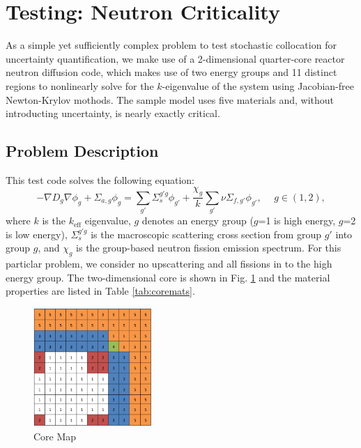 \section{Testing: Neutron Criticality} \label{section diffusion}
As a simple yet sufficiently complex problem to test stochastic collocation for uncertainty quantification, we make use of a 2-dimensional quarter-core reactor neutron diffusion code, which makes use of two energy groups and 11 distinct regions to nonlinearly solve for the $k$-eigenvalue of the system using Jacobian-free Newton-Krylov mothods.  The sample model uses five materials and, without introducting uncertainty, is nearly exactly critical.

\subsection{Problem Description}
This test code solves the following equation:
\begin{equation}
-\nabla D_g\nabla\phi_g+\Sigma_{a,g}\phi_g=\sum_{g'}\Sigma_s^{g'g}\phi_{g'}+\frac{\chi_g}{k}\sum_{g'}\nu\Sigma_{f,g'}\phi_{g'}, \hspace{15pt}g\in(1,2),
\end{equation}
where $k$ is the $k_\text{eff}$ eigenvalue, $g$ denotes an energy group ($g$=1 is high energy, $g$=2 is low energy), $\Sigma_s^{g'g}$ is the macroscopic scattering cross section from group $g'$ into group $g$, and $\chi_g$ is the group-based neutron fission emission spectrum.  For this particlar problem, we consider no upscattering and all fissions in to the high energy group.
The two-dimensional core is shown in Fig. \ref{coremap} and the material properties are listed in Table \ref{tab:coremats}.
\begin{figure}[h]
\centering
   \includegraphics[width=0.4\textwidth]{./graphics/core}
   \caption{Core Map}
   \label{coremap}
\end{figure}
